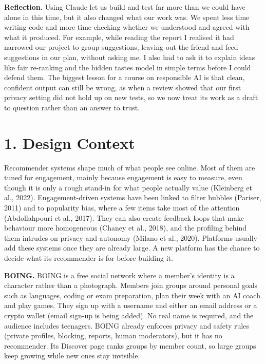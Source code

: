 \documentclass[11pt,letterpaper]{article}
\newlength{\reportboxsep}
\newenvironment{reportbox}
  {\par\smallskip\noindent\begin{lrbox}{\reportboxbin}%
   \begin{minipage}{\dimexpr\linewidth-2\reportboxsep-1.2pt\relax}%
   \small\setlength{\parskip}{4pt plus 1pt}\setlength{\parindent}{0pt}}
  {\end{minipage}\end{lrbox}%
   {\setlength{\fboxsep}{\reportboxsep}\setlength{\fboxrule}{0.6pt}%
    \fcolorbox{boxline}{boxfill}{\usebox{\reportboxbin}}}\par\medskip}
\begin{document}
\begin{reportbox}
\textbf{Reflection.} Using Claude let us build and test far more than we could have alone in this time, but it
also changed what our work was. We spent less time writing code and more time checking whether we understood
and agreed with what it produced. For example, while reading the report I realised it had narrowed our project
to group suggestions, leaving out the friend and feed suggestions in our plan, without asking me. I also had
to ask it to explain ideas like fair re-ranking and the hidden tastes model in simple terms before I could
defend them. The biggest lesson for a course on responsible AI is that clean, confident output can still be
wrong, as when a review showed that our first privacy setting did not hold up on new tests, so we now treat
its work as a draft to question rather than an answer to trust.

\end{reportbox}

\section{1. Design Context}

Recommender systems shape much of what people see online. Most of them are tuned for engagement, mainly
because engagement is easy to measure, even though it is only a rough stand-in for what people actually value
(Kleinberg et al., 2022). Engagement-driven systems have been linked to filter bubbles (Pariser, 2011) and to
popularity bias, where a few items take most of the attention (Abdollahpouri et al., 2017). They can also
create feedback loops that make behaviour more homogeneous (Chaney et al., 2018), and the profiling behind
them intrudes on privacy and autonomy (Milano et al., 2020). Platforms usually add these systems once they are
already large. A new platform has the chance to decide what its recommender is for before building it.

\textbf{BOING.} BOING is a free social network where a member's identity is a character rather than a
photograph. Members join groups around personal goals such as languages, coding or exam preparation, plan
their week with an AI coach and play games. They sign up with a username and either an email address or a
crypto wallet (email sign-up is being added). No real name is required, and the audience includes teenagers.
BOING already enforces privacy and safety rules (private profiles, blocking, reports, human moderators), but
it has no recommender. Its Discover page ranks groups by member count, so large groups keep growing while new
ones stay invisible.
\end{document}
